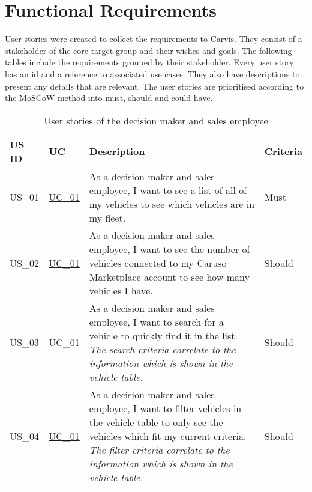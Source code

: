 \chapter{Functional Requirements}
User stories were created to collect the requirements to Carvis. They consist of a stakeholder of the core target group and their wishes and goals. The following tables include the requirements grouped by their stakeholder. Every user story has an id and a reference to associated use cases. They also have descriptions to present any details that are relevant. The user stories are prioritised according to the MoSCoW method into must, should and could have.

  \sffamily
  \begin{footnotesize}
    \begin{longtable}[L L L L]{ p{} p{} p{} p{}}
      \caption                       %
          {User stories of the decision maker and sales employee} %
          \\
      \toprule
      \textbf{US ID} & \textbf{UC} & \textbf{Description} & \textbf{Criteria} \\
      \midrule

      \hypertarget{Ref:US1}{US\_01} & \hyperlink{Ref:UC1}{UC\_01} & As a decision maker and sales employee, I want to see a list of all of my vehicles to see which vehicles are in my fleet. & Must \\ 

      \hypertarget{Ref:US2}{US\_02} & \hyperlink{Ref:UC1}{UC\_01} & As a decision maker and sales employee, I want to see the number of vehicles connected to my Caruso Marketplace account to see how many vehicles I have. & Should \\

      \hypertarget{Ref:US3}{US\_03} & \hyperlink{Ref:UC1}{UC\_01} & As a decision maker and sales employee, I want to search for a vehicle to quickly find it in the list.
      \newline\newline
      \emph{The search criteria correlate to the information which is shown in the vehicle table.} & Should
      \\

      \hypertarget{Ref:US4}{US\_04} & \hyperlink{Ref:UC1}{UC\_01} & As a decision maker and sales employee, I want to filter vehicles in the vehicle table to only see the vehicles which fit my current criteria.
      \newline\newline
      \emph{The filter criteria correlate to the information which is shown in the vehicle table.} & Should
      \\


\end{longtable}
\end{footnotesize}
